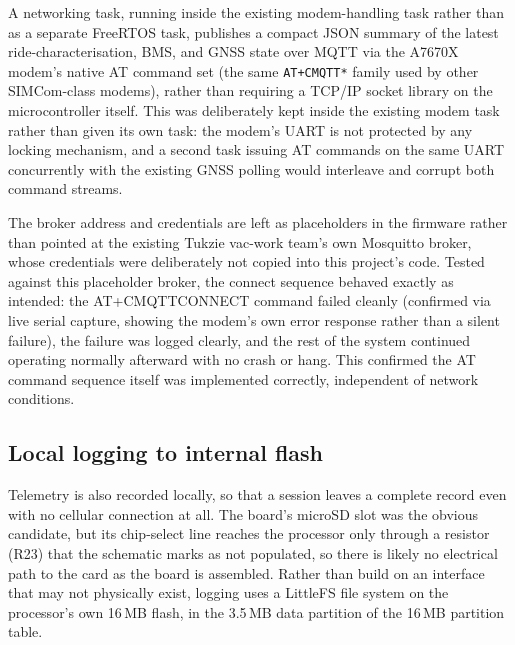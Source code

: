 A networking task, running inside the existing modem-handling task rather than as a separate FreeRTOS task, publishes a compact JSON summary of the latest ride-characterisation, BMS, and GNSS state over MQTT via the A7670X modem's native AT command set (the same \texttt{AT+CMQTT*} family used by other SIMCom-class modems), rather than requiring a TCP/IP socket library on the microcontroller itself. This was deliberately kept inside the existing modem task rather than given its own task: the modem's UART is not protected by any locking mechanism, and a second task issuing AT commands on the same UART concurrently with the existing GNSS polling would interleave and corrupt both command streams.

The broker address and credentials are left as placeholders in the firmware rather than pointed at the existing Tukzie vac-work team's own Mosquitto broker, whose credentials were deliberately not copied into this project's code. Tested against this placeholder broker, the connect sequence behaved exactly as intended: the AT+CMQTTCONNECT command failed cleanly (confirmed via live serial capture, showing the modem's own error response rather than a silent failure), the failure was logged clearly, and the rest of the system continued operating normally afterward with no crash or hang. This confirmed the AT command sequence itself was implemented correctly, independent of network conditions.

\subsection{Local logging to internal flash}
\label{sec:local-logging}

Telemetry is also recorded locally, so that a session leaves a complete record even with no cellular connection at all. The board's microSD slot was the obvious candidate, but its chip-select line reaches the processor only through a resistor (R23) that the schematic marks as not populated, so there is likely no electrical path to the card as the board is assembled. Rather than build on an interface that may not physically exist, logging uses a LittleFS file system on the processor's own 16\,MB flash, in the 3.5\,MB data partition of the 16\,MB partition table.

